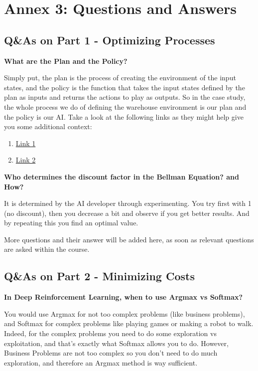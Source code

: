 \documentclass[]{book}
\begin{document}
\newpage

\section{Annex 3: Questions and Answers}

\subsection{Q\&As on Part 1 - Optimizing Processes}

\textbf{What are the Plan and the Policy?}

Simply put, the plan is the process of creating the environment of the input states, and the policy is the function that takes the input states defined by the plan as inputs and returns the actions to play as outputs. So in the case study, the whole process we do of defining the warehouse environment is our plan and the policy is our AI. Take a look at the following links as they might help give you some additional context:

\begin{enumerate}
    \item \href{http://www-anw.cs.umass.edu/~barto/courses/cs687/Chapter\%209.pdf}{Link 1}
    \item \href{https://www.quora.com/In-artificial-intelligence-which-is-better-policies-or-plans-and-why}{Link 2}
\end{enumerate}

\textbf{Who determines the discount factor in the Bellman Equation? and How?}

It is determined by the AI developer through experimenting. You try first with 1 (no discount), then you decrease a bit and observe if you get better results. And by repeating this you find an optimal value.

More questions and their answer will be added here, as soon as relevant questions are asked within the course.

\newpage

\subsection{Q\&As on Part 2 - Minimizing Costs}

\textbf{In Deep Reinforcement Learning, when to use Argmax vs Softmax?}

You would use Argmax for not too complex problems (like business problems), and Softmax for complex problems like playing games or making a robot to walk. Indeed, for the complex problems you need to do some exploration vs exploitation, and that's exactly what Softmax allows you to do. However, Business Problems are not too complex so you don't need to do much exploration, and therefore an Argmax method is way sufficient.
\end{document}
